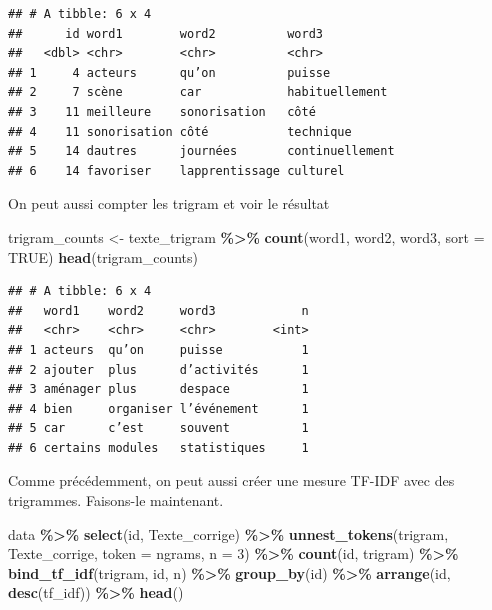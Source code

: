 \documentclass[
]{article}
\newenvironment{Shaded}{\begin{snugshade}}{\end{snugshade}}
\newcommand{\AttributeTok}[1]{\textcolor[rgb]{0.13,0.29,0.53}{#1}}
\newcommand{\ConstantTok}[1]{\textcolor[rgb]{0.56,0.35,0.01}{#1}}
\newcommand{\DecValTok}[1]{\textcolor[rgb]{0.00,0.00,0.81}{#1}}
\newcommand{\FunctionTok}[1]{\textcolor[rgb]{0.13,0.29,0.53}{\textbf{#1}}}
\newcommand{\NormalTok}[1]{#1}
\newcommand{\OtherTok}[1]{\textcolor[rgb]{0.56,0.35,0.01}{#1}}
\newcommand{\SpecialCharTok}[1]{\textcolor[rgb]{0.81,0.36,0.00}{\textbf{#1}}}
\newcommand{\StringTok}[1]{\textcolor[rgb]{0.31,0.60,0.02}{#1}}
\begin{document}
\begin{verbatim}
## # A tibble: 6 x 4
##      id word1        word2          word3          
##   <dbl> <chr>        <chr>          <chr>          
## 1     4 acteurs      qu’on          puisse         
## 2     7 scène        car            habituellement 
## 3    11 meilleure    sonorisation   côté           
## 4    11 sonorisation côté           technique      
## 5    14 dautres      journées       continuellement
## 6    14 favoriser    lapprentissage culturel
\end{verbatim}

On peut aussi compter les trigram et voir le résultat

\begin{Shaded}
\begin{Highlighting}[]
\NormalTok{trigram\_counts }\OtherTok{\textless{}{-}}\NormalTok{ texte\_trigram }\SpecialCharTok{\%\textgreater{}\%}
  \FunctionTok{count}\NormalTok{(word1, word2, word3, }\AttributeTok{sort =} \ConstantTok{TRUE}\NormalTok{)}
\FunctionTok{head}\NormalTok{(trigram\_counts)}
\end{Highlighting}
\end{Shaded}

\begin{verbatim}
## # A tibble: 6 x 4
##   word1    word2     word3            n
##   <chr>    <chr>     <chr>        <int>
## 1 acteurs  qu’on     puisse           1
## 2 ajouter  plus      d’activités      1
## 3 aménager plus      despace          1
## 4 bien     organiser l’événement      1
## 5 car      c’est     souvent          1
## 6 certains modules   statistiques     1
\end{verbatim}

Comme précédemment, on peut aussi créer une mesure TF-IDF avec des
trigrammes. Faisons-le maintenant.

\begin{Shaded}
\begin{Highlighting}[]
\NormalTok{data }\SpecialCharTok{\%\textgreater{}\%}
  \FunctionTok{select}\NormalTok{(id, Texte\_corrige) }\SpecialCharTok{\%\textgreater{}\%}
  \FunctionTok{unnest\_tokens}\NormalTok{(trigram, Texte\_corrige, }\AttributeTok{token =} \StringTok{\textquotesingle{}ngrams\textquotesingle{}}\NormalTok{, }\AttributeTok{n =} \DecValTok{3}\NormalTok{) }\SpecialCharTok{\%\textgreater{}\%}
  \FunctionTok{count}\NormalTok{(id, trigram) }\SpecialCharTok{\%\textgreater{}\%}
  \FunctionTok{bind\_tf\_idf}\NormalTok{(trigram, id, n) }\SpecialCharTok{\%\textgreater{}\%}
  \FunctionTok{group\_by}\NormalTok{(id) }\SpecialCharTok{\%\textgreater{}\%}
  \FunctionTok{arrange}\NormalTok{(id, }\FunctionTok{desc}\NormalTok{(tf\_idf)) }\SpecialCharTok{\%\textgreater{}\%}
  \FunctionTok{head}\NormalTok{()}
\end{Highlighting}
\end{Shaded}
\end{document}
